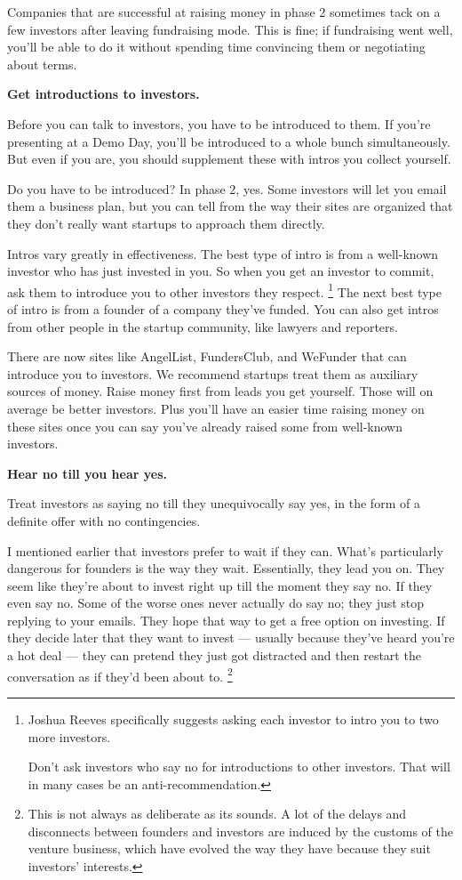 \documentclass[12pt]{book}
\begin{document}
Companies that are successful at raising money in phase 2 sometimes tack
on a few investors after leaving fundraising mode. This is fine; if
fundraising went well, you'll be able to do it without spending time
convincing them or negotiating about terms.

\textbf{Get introductions to investors.}

Before you can talk to investors, you have to be introduced to them. If
you're presenting at a Demo Day, you'll be introduced to a whole bunch
simultaneously. But even if you are, you should supplement these with
intros you collect yourself.

Do you have to be introduced? In phase 2, yes. Some investors will let
you email them a business plan, but you can tell from the way their
sites are organized that they don't really want startups to approach
them directly.

Intros vary greatly in effectiveness. The best type of intro is from a
well-known investor who has just invested in you. So when you get an
investor to commit, ask them to introduce you to other investors they
respect. \footnote{Joshua Reeves specifically suggests asking each investor to
intro you to two more investors.

Don't ask investors who say no for introductions to other investors.
That will in many cases be an anti-recommendation.} The next best type of intro is from a
founder of a company they've funded. You can also get intros from other
people in the startup community, like lawyers and reporters.

There are now sites like AngelList, FundersClub, and WeFunder that can
introduce you to investors. We recommend startups treat them as
auxiliary sources of money. Raise money first from leads you get
yourself. Those will on average be better investors. Plus you'll have an
easier time raising money on these sites once you can say you've already
raised some from well-known investors.

\textbf{Hear no till you hear yes.}

Treat investors as saying no till they unequivocally say yes, in the
form of a definite offer with no contingencies.

I mentioned earlier that investors prefer to wait if they can. What's
particularly dangerous for founders is the way they wait. Essentially,
they lead you on. They seem like they're about to invest right up till
the moment they say no. If they even say no. Some of the worse ones
never actually do say no; they just stop replying to your emails. They
hope that way to get a free option on investing. If they decide later
that they want to invest --- usually because they've heard you're a hot
deal --- they can pretend they just got distracted and then restart the
conversation as if they'd been about to. \footnote{This is not always as deliberate as its sounds. A lot of the
delays and disconnects between founders and investors are induced by the
customs of the venture business, which have evolved the way they have
because they suit investors' interests.}
\end{document}
